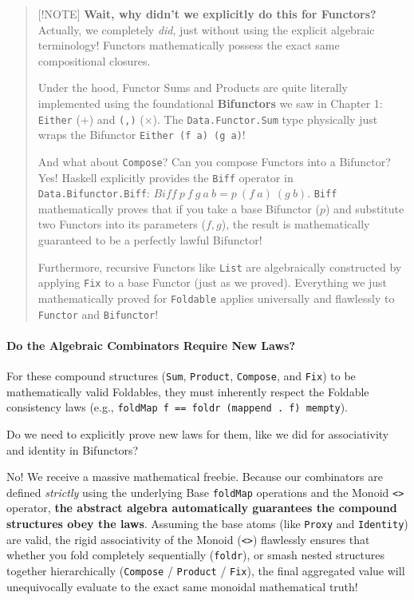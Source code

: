 \documentclass[
]{article}
\begin{document}
\begin{quote}
{[}!NOTE{]} \textbf{Wait, why didn't we explicitly do this for
Functors?} Actually, we completely \emph{did}, just without using the
explicit algebraic terminology! Functors mathematically possess the
exact same compositional closures.

Under the hood, Functor Sums and Products are quite literally
implemented using the foundational \textbf{Bifunctors} we saw in Chapter
1: \texttt{Either} (\(+\)) and \texttt{(,)} (\(\times\)). The
\texttt{Data.Functor.Sum} type physically just wraps the Bifunctor
\texttt{Either\ (f\ a)\ (g\ a)}!

And what about \texttt{Compose}? Can you compose Functors into a
Bifunctor? Yes! Haskell explicitly provides the \texttt{Biff} operator
in \texttt{Data.Bifunctor.Biff}:
\(Biff \ p \ f \ g \ a \ b = p \ (f \ a) \ (g \ b)\). \texttt{Biff}
mathematically proves that if you take a base Bifunctor (\(p\)) and
substitute two Functors into its parameters (\(f, g\)), the result is
mathematically guaranteed to be a perfectly lawful Bifunctor!

Furthermore, recursive Functors like \texttt{List} are algebraically
constructed by applying \texttt{Fix} to a base Functor (just as we
proved). Everything we just mathematically proved for \texttt{Foldable}
applies universally and flawlessly to \texttt{Functor} and
\texttt{Bifunctor}!
\end{quote}

\paragraph{Do the Algebraic Combinators Require New
Laws?}\label{do-the-algebraic-combinators-require-new-laws}

For these compound structures (\texttt{Sum}, \texttt{Product},
\texttt{Compose}, and \texttt{Fix}) to be mathematically valid
Foldables, they must inherently respect the Foldable consistency laws
(e.g., \texttt{foldMap\ f\ ==\ foldr\ (mappend\ .\ f)\ mempty}).

Do we need to explicitly prove new laws for them, like we did for
associativity and identity in Bifunctors?

No! We receive a massive mathematical freebie. Because our combinators
are defined \emph{strictly} using the underlying Base \texttt{foldMap}
operations and the Monoid \texttt{\textless{}\textgreater{}} operator,
\textbf{the abstract algebra automatically guarantees the compound
structures obey the laws}. Assuming the base atoms (like \texttt{Proxy}
and \texttt{Identity}) are valid, the rigid associativity of the Monoid
(\texttt{\textless{}\textgreater{}}) flawlessly ensures that whether you
fold completely sequentially (\texttt{foldr}), or smash nested
structures together hierarchically (\texttt{Compose} / \texttt{Product}
/ \texttt{Fix}), the final aggregated value will unequivocally evaluate
to the exact same monoidal mathematical truth!
\end{document}

